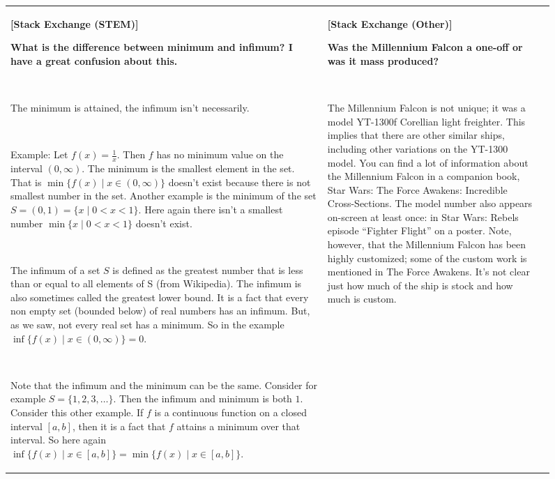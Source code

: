 
\begin{figure}[p]
    \scriptsize
    \centering
    \begin{tabular}{@{}p{}p{}p{}@{}}
    \toprule
    \textbf{[Stack Exchange (STEM)]}
    
    \textcolor[HTML]{3078BE}{\textbf{What is the difference between minimum and infimum? I have a great confusion about this.}}
    
    ~
    
    The minimum is attained, the infimum isn't necessarily. 

    ~
    
    Example: Let $f(x) = \frac{1}{x}$. Then $f$ has no minimum value on the interval $(0,\infty)$. The minimum is the smallest element in the set. That is $\min\{f(x)\mid x\in (0,\infty)\}$ doesn't exist because there is not smallest number in the set. Another example is the minimum of the set $S = (0,1) = \{x\mid 0<x<1\}$. Here again there isn't a smallest number $\min\{x\mid 0<x<1\}$ doesn't exist.

    ~
    
    The infimum of a set $S$ is defined as the greatest number that is less than or equal to all elements of S (from Wikipedia). The infimum is also sometimes called the greatest lower bound.
    It is a fact that every non empty set (bounded below) of real numbers has an infimum. But, as we saw, not every real set has a minimum.
    So in the example $\inf\{f(x)\mid x\in (0,\infty)\} = 0.$

    ~
    
    Note that the infimum and the minimum can be the same. Consider for example $S = \{1,2,3,\dots\}$. Then the infimum and minimum is both $1$.
    Consider this other example. If $f$ is a continuous function on a closed interval $[a,b]$,  then it is a fact that $f$ attains a minimum over that interval. So here again $\inf\{f(x)\mid x\in [a,b]\} = \min\{f(x)\mid x\in [a,b]\}$.
    
    &
    \textbf{[Stack Exchange (Other)]}
    
    \textcolor[HTML]{3078BE}{\textbf{Was the Millennium Falcon a one-off or was it mass produced?}}
    
    ~
    
    The Millennium Falcon is not unique; it was a model YT-1300f Corellian light freighter. This implies that there are other similar ships, including other variations on the YT-1300 model. You can find a lot of information about the Millennium Falcon in a companion book, Star Wars: The Force Awakens: Incredible Cross-Sections. The model number also appears on-screen at least once: in Star Wars: Rebels episode ``Fighter Flight'' on a poster. Note, however, that the Millennium Falcon has been highly customized; some of the custom work is mentioned in The Force Awakens. It's not clear just how much of the ship is stock and how much is custom.


\end{tabular}
\end{figure}
